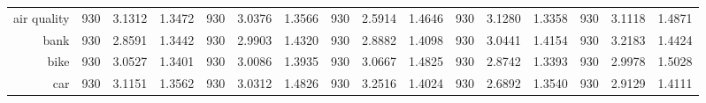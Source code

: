 \begin{table}[H]
{\begin{tabular}{rccccccccccccccc}
			air quality                         & 930                                 & 3.1312                                                                    & 1.3472          & 930                                & 3.0376                                                                             & 1.3566          & 930                                & \cellcolor[rgb]{ .776,  .937,  .808}\textcolor[rgb]{ 0,  .38,  0}{2.5914} & 1.4646          & 930                                & 3.1280                                                                    & 1.3358          & 930                                    & 3.1118                                                                    & 1.4871          \\
			bank                                & 930                                 & \cellcolor[rgb]{ .776,  .937,  .808}\textcolor[rgb]{ 0,  .38,  0}{2.8591} & 1.3442          & 930                                & 2.9903                                                                             & 1.4320          & 930                                & 2.8882                                                                    & 1.4098          & 930                                & 3.0441                                                                    & 1.4154          & 930                                    & 3.2183                                                                    & 1.4424          \\
			bike                                & 930                                 & 3.0527                                                                    & 1.3401          & 930                                & 3.0086                                                                             & 1.3935          & 930                                & 3.0667                                                                    & 1.4825          & 930                                & \cellcolor[rgb]{ .776,  .937,  .808}\textcolor[rgb]{ 0,  .38,  0}{2.8742} & 1.3393          & 930                                    & 2.9978                                                                    & 1.5028          \\
			car                                 & 930                                 & 3.1151                                                                    & 1.3562          & 930                                & 3.0312                                                                             & 1.4826          & 930                                & 3.2516                                                                    & 1.4024          & 930                                & \cellcolor[rgb]{ .776,  .937,  .808}\textcolor[rgb]{ 0,  .38,  0}{2.6892} & 1.3540          & 930                                    & 2.9129                                                                    & 1.4111          \\

\end{tabular}}
\end{table}
